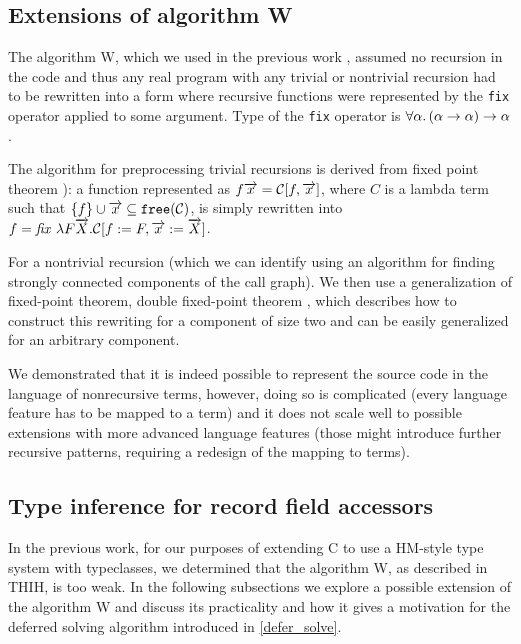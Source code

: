 \subsection{Extensions of algorithm W}

The algorithm W, which we used in the previous work \cite{klepl2020type}, assumed no recursion in the code and thus any real program with any trivial or nontrivial recursion had to be rewritten into a form where recursive functions were represented by the \lstinline{fix} operator applied to some argument. Type of the \lstinline{fix} operator is $\forall \alpha . \left(\alpha \to \alpha\right) \to \alpha$.

The algorithm for preprocessing trivial recursions is derived from fixed point theorem \cite{barendregt1992lambda,damas1982principal}): a function represented as $f \overrightarrow{x} = \mathcal{C}[f, \overrightarrow{x}]$, where $C$ is a lambda term such that $\{f\} \cup \overrightarrow{x} \subseteq \mathtt{free} (\mathcal{C})$, is simply rewritten into $f = \mathit{fix}\ \lambda F \overrightarrow{X} .\mathcal{C}[f := F, \overrightarrow{x} := \overrightarrow{X}]$.

For a nontrivial recursion (which we can identify using an algorithm for finding strongly connected components of the call graph). We then use a generalization of fixed-point theorem, double fixed-point theorem \cite{stepanek}, which describes how to construct this rewriting for a component of size two and can be easily generalized for an arbitrary component.

We demonstrated that it is indeed possible to represent the source code in the language of nonrecursive terms, however, doing so is complicated (every language feature has to be mapped to a term) and it does not scale well to possible extensions with more advanced language features (those might introduce further recursive patterns, requiring a redesign of the mapping to terms).

\subsection{Type inference for record field accessors}
\label{ex_structs}

In the previous work, for our purposes of extending C to use a HM-style type system with typeclasses, we determined that the algorithm W, as described in THIH, is too weak. In the following subsections we explore a possible extension of the algorithm W and discuss its practicality and how it gives a motivation for the deferred solving algorithm introduced in \cref{defer_solve}.

